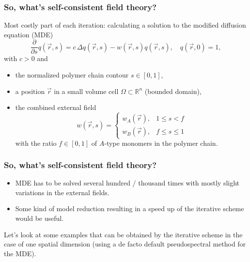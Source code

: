 \begin{frame}[t]
    \frametitle{So, what's self-consistent field theory?}

    Most costly part of each iteration:
    calculating a solution to the modified diffusion equation (MDE)
        \begin{equation}
            \frac{\partial}{\partial s}q(\vec{r}, s) = c\,\Delta q(\vec{r}, s) - w(\vec{r}, s)q(\vec{r}, s), \quad q(\vec{r}, 0) = 1,
        \end{equation}
    with $c > 0$ and
    \begin{itemize}
        \item the normalized polymer chain contour $s \in [0, 1]$,
        \item a position $\vec{r}$ in a small volume cell $\Omega \subset \mathbb{R}^{n}$ (bounded domain),
        \item {} the combined external field
        \begin{equation}
            w(\vec{r}, s) = \begin{cases}
                w_{A}(\vec{r}), & 1 \leq s < f \\
                w_{B}(\vec{r}), & f \leq s \leq 1
            \end{cases}
        \end{equation}
        with the ratio $f \in [0, 1]$ of $A$-type monomers in the polymer chain.
    \end{itemize}
\end{frame}

\begin{frame}[t]
    \frametitle{So, what's self-consistent field theory?}

    \vfill

    \begin{itemize}
        \item MDE has to be solved several hundred / thousand times with mostly slight variations in the external fields.
        \item {} Some kind of model reduction resulting in a speed up of the iterative scheme would be useful.
    \end{itemize}

    \vfill
    Let's look at some examples that can be obtained by the iterative scheme in the case of one spatial dimension
    (using a de facto default pseudospectral method for the MDE).
    \vfill
\end{frame}

